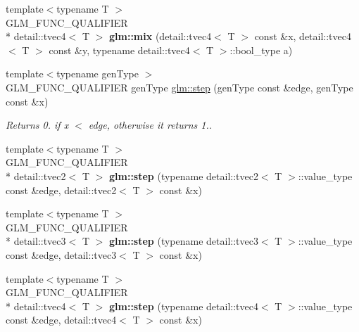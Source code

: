 \begin{DoxyCompactItemize}
\item 
\hypertarget{namespaceglm_ac37856ea533b4d5b40cf13fd1656f81a}{{\footnotesize template$<$typename T $>$ }\\G\-L\-M\-\_\-\-F\-U\-N\-C\-\_\-\-Q\-U\-A\-L\-I\-F\-I\-E\-R \\*
detail\-::tvec4$<$ T $>$ {\bfseries glm\-::mix} (detail\-::tvec4$<$ T $>$ const \&x, detail\-::tvec4$<$ T $>$ const \&y, typename detail\-::tvec4$<$ T $>$\-::bool\-\_\-type a)}\label{namespaceglm_ac37856ea533b4d5b40cf13fd1656f81a}

\item 
{\footnotesize template$<$typename gen\-Type $>$ }\\G\-L\-M\-\_\-\-F\-U\-N\-C\-\_\-\-Q\-U\-A\-L\-I\-F\-I\-E\-R gen\-Type \hyperlink{group__core__func__common_ga3d3199dcbbb0ac8e0d9664d538702a40}{glm\-::step} (gen\-Type const \&edge, gen\-Type const \&x)
\begin{DoxyCompactList}\small\item\em Returns 0. if x $<$ edge, otherwise it returns 1.. \end{DoxyCompactList}\item 
\hypertarget{namespaceglm_ad31450d9914d789050de9d03963ff6dd}{{\footnotesize template$<$typename T $>$ }\\G\-L\-M\-\_\-\-F\-U\-N\-C\-\_\-\-Q\-U\-A\-L\-I\-F\-I\-E\-R \\*
detail\-::tvec2$<$ T $>$ {\bfseries glm\-::step} (typename detail\-::tvec2$<$ T $>$\-::value\-\_\-type const \&edge, detail\-::tvec2$<$ T $>$ const \&x)}\label{namespaceglm_ad31450d9914d789050de9d03963ff6dd}

\item 
\hypertarget{namespaceglm_abb223e75ad40dd1097f8b96162d128b4}{{\footnotesize template$<$typename T $>$ }\\G\-L\-M\-\_\-\-F\-U\-N\-C\-\_\-\-Q\-U\-A\-L\-I\-F\-I\-E\-R \\*
detail\-::tvec3$<$ T $>$ {\bfseries glm\-::step} (typename detail\-::tvec3$<$ T $>$\-::value\-\_\-type const \&edge, detail\-::tvec3$<$ T $>$ const \&x)}\label{namespaceglm_abb223e75ad40dd1097f8b96162d128b4}

\item 
\hypertarget{namespaceglm_a5b8d769e10531d75d560d533c4a2e9d2}{{\footnotesize template$<$typename T $>$ }\\G\-L\-M\-\_\-\-F\-U\-N\-C\-\_\-\-Q\-U\-A\-L\-I\-F\-I\-E\-R \\*
detail\-::tvec4$<$ T $>$ {\bfseries glm\-::step} (typename detail\-::tvec4$<$ T $>$\-::value\-\_\-type const \&edge, detail\-::tvec4$<$ T $>$ const \&x)}\label{namespaceglm_a5b8d769e10531d75d560d533c4a2e9d2}


\end{DoxyCompactItemize}

